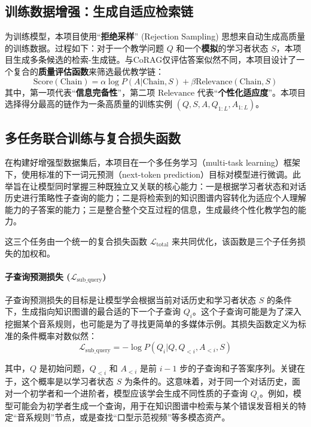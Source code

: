 \subsection{训练数据增强：生成自适应检索链}
为训练模型，本项目使用“\textbf{拒绝采样}” (Rejection Sampling) 思想来自动生成高质量的训练数据。过程如下：对于一个教学问题 $Q$ 和一个\textbf{模拟}的学习者状态 $S$，本项目生成多条候选的检索-生成链。与CoRAG仅评估答案似然不同，本项目设计了一个复合的\textbf{质量评估函数}来筛选最优教学链：
\begin{equation}
\text{Score}(\text{Chain}) = \alpha \log P(A | \text{Chain}, S) + \beta \text{Relevance}(\text{Chain}, S)
\end{equation}
其中，第一项代表“\textbf{信息完备性}”，第二项 $\text{Relevance}$ 代表“\textbf{个性化适应度}”。本项目选择得分最高的链作为一条高质量的训练实例 $(Q, S, A, Q_{1:L}, A_{1:L})$。

\subsection{多任务联合训练与复合损失函数}
在构建好增强型数据集后，本项目在一个多任务学习（multi-task learning）框架下，使用标准的下一词元预测（next-token prediction）目标对模型进行微调。此举旨在让模型同时掌握三种既独立又关联的核心能力：一是根据学习者状态和对话历史进行策略性子查询的能力；二是将检索到的知识图谱内容转化为适应个人理解能力的子答案的能力；三是整合整个交互过程的信息，生成最终个性化教学包的能力。

这三个任务由一个统一的复合损失函数 $\mathcal{L}_{\text{total}}$ 来共同优化，该函数是三个子任务损失的加权和。

\paragraph{子查询预测损失 ($\mathcal{L}_{\text{sub\_query}}$)}
子查询预测损失的目标是让模型学会根据当前对话历史和学习者状态 $S$ 的条件下，生成指向知识图谱的最合适的下一个子查询 $Q_i$。这个子查询可能是为了深入挖掘某个音系规则，也可能是为了寻找更简单的多媒体示例。其损失函数定义为标准的条件概率对数似然：
\begin{equation}
\mathcal{L}_{\text{sub\_query}} = - \log P(Q_i | Q, Q_{<i}, A_{<i}, S)
\end{equation}

其中，$Q$ 是初始问题，$Q_{<i}$ 和 $A_{<i}$ 是前 $i-1$ 步的子查询和子答案序列。关键在于，这个概率是以学习者状态 $S$ 为条件的。这意味着，对于同一个对话历史，面对一个初学者和一个进阶者，模型应该学会生成不同性质的子查询 $Q_i$。例如，模型可能会为初学者生成一个查询，用于在知识图谱中检索与某个错误发音相关的特定“音系规则”节点，或是查找“口型示范视频”等多模态资产。

